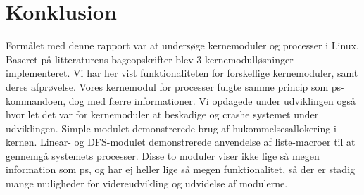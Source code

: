 \chapter{Konklusion}
Formålet med denne rapport var at undersøge kernemoduler og processer i Linux. Baseret på litteraturens bageopskrifter blev 3 kernemodulløsninger implementeret. Vi har her vist funktionaliteten for forskellige kernemoduler, samt deres afprøvelse. Vores kernemodul for processer fulgte samme princip som ps-kommandoen, dog med færre informationer. Vi opdagede under udviklingen også hvor let det var for kernemoduler at beskadige og crashe systemet under udviklingen. Simple-modulet demonstrerede brug af hukommelsesallokering i kernen. Linear- og DFS-modulet demonstrerede anvendelse af liste-macroer til at gennemgå systemets processer. Disse to moduler viser ikke lige så megen information som ps, og har ej heller lige så megen funktionalitet, så der er stadig mange muligheder for videreudvikling og udvidelse af modulerne.